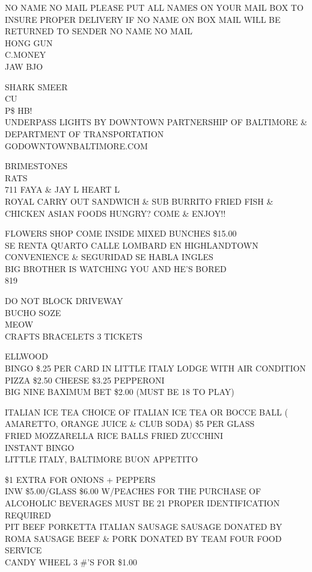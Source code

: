 \documentclass[10pt,letterpaper]{article}
\begin{document}
NO NAME NO MAIL PLEASE PUT ALL NAMES ON YOUR MAIL BOX TO INSURE PROPER DELIVERY IF NO NAME ON BOX MAIL WILL BE RETURNED TO SENDER NO NAME NO MAIL\\
HONG GUN\\
C.MONEY\\
JAW BJO

SHARK SMEER\\
CU\\
P\$ HB!\\
UNDERPASS LIGHTS BY DOWNTOWN PARTNERSHIP OF BALTIMORE \& DEPARTMENT OF TRANSPORTATION GODOWNTOWNBALTIMORE.COM

BRIMESTONES\\
RATS\\
711 FAYA \& JAY L HEART L\\
ROYAL CARRY OUT SANDWICH \& SUB BURRITO FRIED FISH \& CHICKEN ASIAN FOODS HUNGRY?  COME \& ENJOY!!

FLOWERS SHOP COME INSIDE MIXED BUNCHES \$15.00\\
SE RENTA QUARTO CALLE LOMBARD EN HIGHLANDTOWN CONVENIENCE \& SEGURIDAD SE HABLA INGLES\\
BIG BROTHER IS WATCHING YOU AND HE'S BORED\\
819

DO NOT BLOCK DRIVEWAY\\
BUCHO SOZE\\
MEOW\\
CRAFTS BRACELETS 3 TICKETS

ELLWOOD\\
BINGO \$.25 PER CARD IN LITTLE ITALY LODGE WITH AIR CONDITION\\
PIZZA \$2.50 CHEESE \$3.25 PEPPERONI\\
BIG NINE BAXIMUM BET \$2.00 (MUST BE 18 TO PLAY)

ITALIAN ICE TEA CHOICE OF ITALIAN ICE TEA OR BOCCE BALL ( AMARETTO, ORANGE JUICE \& CLUB SODA) \$5 PER GLASS\\
FRIED MOZZARELLA RICE BALLS FRIED ZUCCHINI\\
INSTANT BINGO\\
LITTLE ITALY, BALTIMORE BUON APPETITO

\$1 EXTRA FOR ONIONS + PEPPERS\\
INW \$5.00/GLASS \$6.00 W/PEACHES FOR THE PURCHASE OF ALCOHOLIC BEVERAGES MUST BE 21 PROPER IDENTIFICATION REQUIRED\\
PIT BEEF PORKETTA ITALIAN SAUSAGE SAUSAGE DONATED BY ROMA SAUSAGE BEEF \& PORK DONATED BY TEAM FOUR FOOD SERVICE\\
CANDY WHEEL 3 \#'S FOR \$1.00
\end{document}
